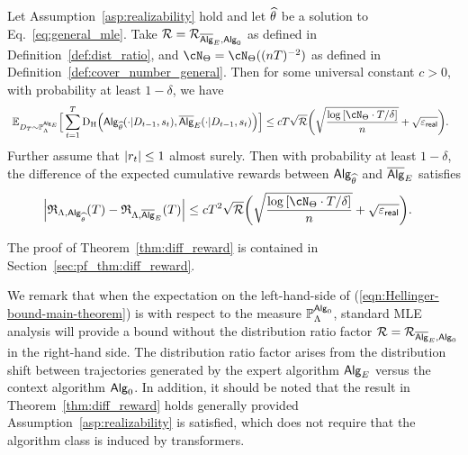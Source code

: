 \begin{theorem}\label{thm:diff_reward} Let Assumption~\ref{asp:realizability} hold and let ${\widehat{\theta}}$ be a solution to Eq.~\eqref{eq:general_mle}. Take ${\mathcal{R}} = {\mathcal{R}}_{\overline{\mathsf{Alg}}_{E},{\mathsf{Alg}}_0}$ as defined in Definition~\ref{def:dist_ratio}, and $\cN_{\Parspace} = \cN_{\Parspace}((\Numobs\totlen)^{-2})$  as defined in Definition~\ref{def:cover_number_general}. Then for some universal constant $c>0$, with probability at least $1-\delta$, we have
\begin{align}\label{eqn:Hellinger-bound-main-theorem}
&~ \E_{\dset_\totlen\sim \P^{\sAlg_\shortexp}_\prior}\Big[ \sum_{t=1}^\totlen \HelD \paren{  \sAlg_{{\EstPar}}(\cdot|\dset_{t-1},\state_t ),\osAlg_{\shortexp}(\cdot|\dset_{t-1},\state_t )} \Big]
\le c {\totlen} \sqrt{\distratio}
\bigg(\sqrt{\frac{\log \brac{ \cN_{\Parspace} \cdot
 \totlen/\delta } }{n}} +  \sqrt{\geneps}\bigg).
\end{align}
Further assume that $|{r}_t| \leq 1$ almost surely. Then with probability at least $1-\delta$, the difference of the expected cumulative rewards between ${\mathsf{Alg}}_{\widehat{\theta}}$ and $\overline{\mathsf{Alg}}_{E}$ satisfies
\begin{align}\label{eqn:reward-bound-main-theorem}
\Big|\totreward_{\prior,\sAlg_\EstPar}(\totlen)-\totreward_{\prior,\osAlg_\shortexp}(\totlen)\Big|
&\leq
c \totlen^2 \sqrt{\distratio} \bigg(\sqrt{\frac{\log \brac{ \cN_{\Parspace} \cdot
 \totlen/\delta } }{n}} +  \sqrt{\geneps}\bigg).
\end{align}
\end{theorem}

The proof of Theorem~\ref{thm:diff_reward} is contained in Section~\ref{sec:pf_thm:diff_reward}.

We remark that when the expectation on the left-hand-side of (\ref{eqn:Hellinger-bound-main-theorem}) is with respect to the measure $\mathbb{P}_{\Lambda}^{{\mathsf{Alg}}_0}$, standard MLE analysis will provide a bound without the distribution ratio factor ${\mathcal{R}} = {\mathcal{R}}_{\overline{\mathsf{Alg}}_{E},{\mathsf{Alg}}_0}$ in the right-hand side. The distribution ratio factor arises from the distribution shift between trajectories generated by the expert algorithm ${\mathsf{Alg}}_{E}$ versus the context algorithm ${\mathsf{Alg}}_0$.  In addition, it should be noted that the result in Theorem~\ref{thm:diff_reward} holds generally provided Assumption~\ref{asp:realizability} is satisfied, which does not require that the algorithm class is induced by transformers.








